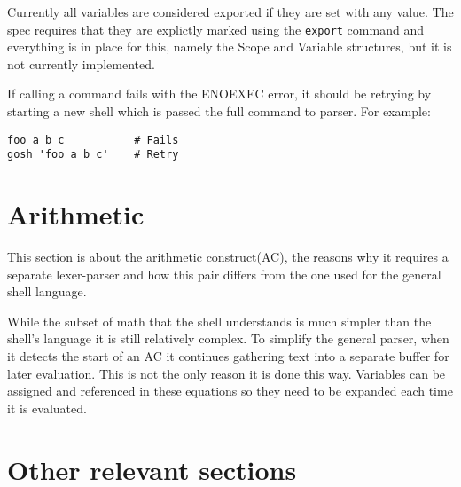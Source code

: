 Currently all variables are considered exported if they are set with any value.
The spec requires that they are explictly marked using the \verb!export! command and everything is in place for this, namely the Scope and Variable structures, but it is not currently implemented.

If calling a command fails with the ENOEXEC error, it should be retrying by starting a new shell which is passed the full command to parser. For example:
\begin{verbatim}
foo a b c           # Fails
gosh 'foo a b c'    # Retry
\end{verbatim}

\section{Arithmetic}
This section is about the arithmetic construct(AC), the reasons why it requires a separate lexer-parser and how this pair differs from the one used for the general shell language.

While the subset of math that the shell understands is much simpler than the shell's language it is still relatively complex. 
To simplify the general parser, when it detects the start of an AC it continues gathering text into a separate buffer for later evaluation.
This is not the only reason it is done this way.
Variables can be assigned and referenced in these equations so they need to be expanded each time it is evaluated.




















\section{Other relevant sections}